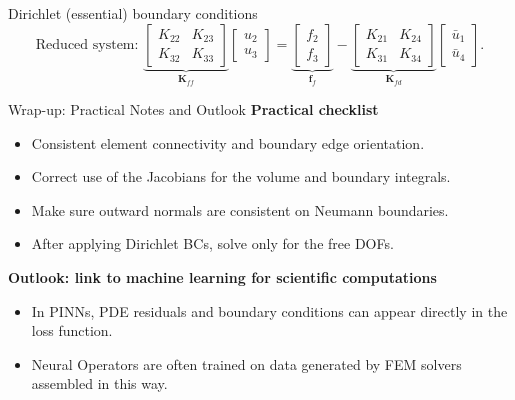 \documentclass{beamer}
\begin{document}
\begin{frame}{Dirichlet (essential) boundary conditions}
	\[
	\mbox{Reduced system:   }\underbrace{
		\begin{bmatrix}
			K_{22} & K_{23} \\
			K_{32} & K_{33}
	\end{bmatrix}}_{\mathbf{K}_{ff}}
	\begin{bmatrix}
		u_2 \\[2pt] u_3
	\end{bmatrix}
	=
	\underbrace{
		\begin{bmatrix}
			f_2 \\[2pt] f_3
	\end{bmatrix}}_{\mathbf{f}_f}
	-
	\underbrace{
		\begin{bmatrix}
			K_{21} & K_{24} \\
			K_{31} & K_{34}
	\end{bmatrix}}_{\mathbf{K}_{fd}}
	\begin{bmatrix}
		\bar u_1 \\[2pt] \bar u_4
	\end{bmatrix}.
	\]
\end{frame}



\begin{frame}{Wrap-up: Practical Notes and Outlook}
	\small
	\textbf{Practical checklist}
	\begin{itemize}
		\item Consistent element connectivity and boundary edge orientation.
		\item Correct use of the Jacobians for the volume and boundary integrals.
		\item Make sure outward normals are consistent on Neumann boundaries.
		\item After applying Dirichlet BCs, solve only for the free DOFs.
	\end{itemize}
	
	\vspace{0.5em}
	\textbf{Outlook: link to machine learning for scientific computations}
	\begin{itemize}
		\item In PINNs, PDE residuals and boundary conditions can appear directly in the loss function.
		\item Neural Operators are often trained on data generated by FEM solvers assembled in this way.
	\end{itemize}
\end{frame}
\end{document}
